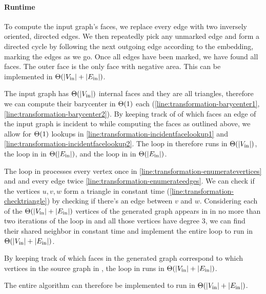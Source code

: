 \paragraph{Runtime}

To compute the input graph's faces, we replace every edge with two inversely oriented, directed edges. We then repeatedly pick any unmarked edge and form a directed cycle by following the next outgoing edge according to the embedding, marking the edges as we go. Once all edges have been marked, we have found all faces. The outer face is the only face with negative area. This can be implemented in $\Theta(\left\lvert V_\text{in}\right\rvert + \left\lvert E_\text{in}\right\rvert)$.

The input graph has $\Theta(\left\lvert V_\text{in}\right\rvert)$ internal faces and they are all triangles, therefore we can compute their barycenter in $\Theta(1)$ each (\cref{line:transformation-barycenter1}, \cref{line:transformation-barycenter2}). By keeping track of of which faces an edge of the input graph is incident to while computing the faces as outlined above, we allow for $\Theta(1)$ lookups in \cref{line:transformation-incidentfacelookup1} and \cref{line:transformation-incidentfacelookup2}. The loop in  therefore runs in $\Theta(\left\lvert V_\text{in}\right\rvert)$, the loop in  in $\Theta(\left\lvert E_\text{in}\right\rvert)$, and the loop in  in $\Theta(\left\lvert E_\text{in}\right\rvert)$.

The loop in  processes every vertex once in \cref{line:transformation-enumeratevertices} and and every edge twice \cref{line:transformation-enumerateedges}. We can check if the vertices $u,v,w$ form a triangle in constant time (\cref{line:transformation-checktriangle}) by checking if there's an edge between $v$ and $w$. Considering each of the $\Theta(\left\lvert V_\text{in}\right\rvert + \left\lvert E_\text{in}\right\rvert)$ vertices of the generated graph appears in  in no more than two iterations of the loop in  and all those vertices have degree 3, we can find their shared neighbor in constant time and implement the entire loop to run in $\Theta(\left\lvert V_\text{in}\right\rvert + \left\lvert E_\text{in}\right\rvert)$.

By keeping track of which faces in the generated graph correspond to which vertices in the source graph in , the loop in  runs in $\Theta(\left\lvert V_\text{in}\right\rvert + \left\lvert E_\text{in}\right\rvert)$.

The entire algorithm can therefore be implemented to run in $\Theta(\left\lvert V_\text{in}\right\rvert + \left\lvert E_\text{in}\right\rvert)$.
